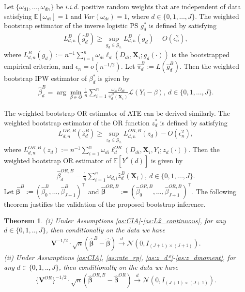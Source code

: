 \documentclass[11pt]{article}
\newtheorem{theorem}[thm]{Theorem}
\numberwithin{equation}{section}
\begin{document}
Let $\{\omega_{d1},...,\omega_{dn}\}$ be $i.i.d.$ positive random weights that are independent of data satisfying $\mathbb{E}[\omega_{di}]=1$ and $Var(\omega_{di})=1$, where $d\in\{0,1,...,J\}$. The weighted bootstrap estimator of the inverse logistic PS $g_d^*$  is defined by satisfying
\begin{align*}
	L^{B}_{d,n}(\widehat{g}^{B}_d)\geq \sup_{g_d\in\mathcal{G}_n}L^{B}_{d,n}(g_d)-O(\epsilon^2_n),
\end{align*}
where $
L^{B}_{d,n}(g_d):=n^{-1}\sum_{i=1}^n\omega_{di}\ell_d(D_{di},\boldsymbol{X}_{i};g_d(\cdot))$
is the bootstrapped empirical criterion, and $\epsilon_n=o(n^{-1/2})$. Let $\widehat{\pi}^{B}_d:=L(\widehat{g}^{B}_d)$. Then the weighted bootstrap IPW estimator of $\beta_d^*$ is given by
\begin{align*}
	\widehat{\beta}^{B}_d=\arg\min_{\beta\in\Theta}\frac{1}{n}
	\sum_{i=1}^n\frac{\omega_{di}D_{di}}{\widehat{\pi}^{B}_d(\boldsymbol{X}_{i})}\mathcal{L}\left(Y_i-\beta\right),\ d\in \{0,1,...,J\}.
\end{align*}
{\color{black}The weighted bootstrap OR estimator of ATE can be derived similarly. The weighted bootstrap estimator of the OR function $z_d^*$  is defined by satisfying
	\begin{align*}
		L^{OR,B}_{d,n}(\widehat{z}^{B}_d)\geq \sup_{z_d\in\mathcal{G}_n}L^{OR,B}_{d,n}(z_d)-O(\epsilon^2_n),
	\end{align*}
	where $
	L^{OR,B}_{d,n}(z_d):=n^{-1}\sum_{i=1}^n\omega_{di}\ell^{OR}_d(D_{di},\boldsymbol{X}_{i},Y_i;z_d(\cdot))$.
	Then the weighted bootstrap OR estimator of $\mathbb{E}[Y^*(d)]$ is given by
	\begin{align*}
		\widehat{\beta}^{OR,B}_d=\frac{1}{n}
		\sum_{i=1}^n\omega_{d,i}\widehat{z}^{B}_d(\boldsymbol{X}_i),\ d\in \{0,1,...,J\}.
	\end{align*}
	Let $\widehat{\boldsymbol{\beta}}^{B}:=(\widehat{\beta}^{B}_0,...,\widehat{\beta}^{B}_{J+1})^\top$ and $\widehat{\boldsymbol{\beta}}^{OR,B}:=(\widehat{\beta}^{OR,B}_0,...,\widehat{\beta}^{OR,B}_{J+1})^\top$. The following theorem justifies the validation of the proposed bootstrap inference.
	\begin{theorem}\label{thm:eff_IPW_bootsrap}
		(i) Under Assumptions \ref{as:CIA}-\ref{as:L2_continuous}, for any $d\in\{0,1,..,J\}$, then conditionally on the data we have
		\begin{align*}
			\boldsymbol{V}^{-1/2}\cdot \sqrt{n}\left(\widehat{\boldsymbol{\beta}}^{B}-\widehat{\boldsymbol{\beta}}\right)\xrightarrow{d}\mathcal{N}(0,I_{(J+1)\times (J+1)}).
		\end{align*}	
		(ii) 	Under Assumptions \ref{as:CIA}, \ref{as:rate_rp}, \ref{as:z_d*}-\ref{as:z_dmoment}, for any $d\in\{0,1,..,J\}$, then conditionally on the data we have
		\begin{align*}
			\{\boldsymbol{V}^{OR}\}^{-1/2}\cdot \sqrt{n}\left(\widehat{\boldsymbol{\beta}}^{OR,B}-\widehat{\boldsymbol{\beta}}^{OR}\right)\xrightarrow{d}\mathcal{N}(0,I_{(J+1)\times (J+1)}).
		\end{align*}	
\end{theorem}}
\end{document}
